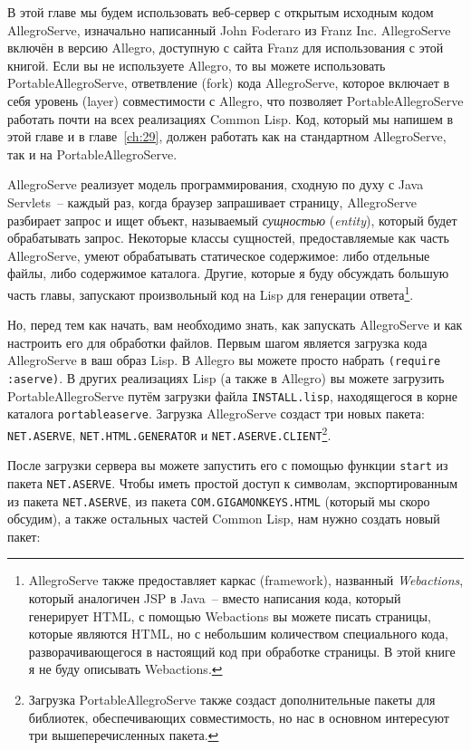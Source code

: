 В этой главе мы будем использовать веб-сервер с открытым исходным кодом AllegroServe,
изначально написанный John Foderaro из Franz Inc. AllegroServe включён в версию Allegro,
доступную с сайта Franz для использования с этой книгой. Если вы не используете Allegro,
то вы можете использовать PortableAllegroServe, ответвление (fork) кода AllegroServe,
которое включает в себя уровень (layer) совместимости с Allegro, что позволяет
PortableAllegroServe работать почти на всех реализациях Common Lisp. Код, который мы
напишем в этой главе и в главе~\ref{ch:29}, должен работать как на стандартном
AllegroServe, так и на PortableAllegroServe.

AllegroServe реализует модель программирования, сходную по духу с Java Servlets~-- каждый
раз, когда браузер запрашивает страницу, AllegroServe разбирает запрос и ищет объект,
называемый \textit{сущностью} (\textit{entity}), который будет обрабатывать
запрос. Некоторые классы сущностей, предоставляемые как часть AllegroServe, умеют
обрабатывать статическое содержимое: либо отдельные файлы, либо содержимое
каталога. Другие, которые я буду обсуждать большую часть главы, запускают произвольный код
на Lisp для генерации ответа\footnote{AllegroServe также предоставляет каркас
  (framework), названный \textit{Webactions}, который аналогичен JSP в Java~-- вместо
  написания кода, который генерирует HTML, с помощью Webactions вы можете писать страницы,
  которые являются HTML, но с небольшим количеством специального кода, разворачивающегося
  в настоящий код при обработке страницы. В этой книге я не буду описывать Webactions.}.

Но, перед тем как начать, вам необходимо знать, как запускать AllegroServe и как настроить
его для обработки файлов. Первым шагом является загрузка кода AllegroServe в ваш образ
Lisp. В Allegro вы можете просто набрать \lstinline{(require :aserve)}. В других реализациях
Lisp (а также в Allegro) вы можете загрузить PortableAllegroServe путём загрузки файла
\lstinline{INSTALL.lisp}, находящегося в корне каталога \lstinline{portableaserve}. Загрузка
AllegroServe создаст три новых пакета: \lstinline{NET.ASERVE}, \lstinline{NET.HTML.GENERATOR} и
\lstinline{NET.ASERVE.CLIENT}\footnote{Загрузка PortableAllegroServe также создаст
  дополнительные пакеты для библиотек, обеспечивающих совместимость, но нас в основном
  интересуют три вышеперечисленных пакета.}.

После загрузки сервера вы можете запустить его с помощью функции \lstinline{start} из пакета
\lstinline{NET.ASERVE}. Чтобы иметь простой доступ к символам, экспортированным из пакета
\lstinline{NET.ASERVE}, из пакета \lstinline{COM.GIGAMONKEYS.HTML} (который мы скоро обсудим), а
также остальных частей Common Lisp, нам нужно создать новый пакет:

